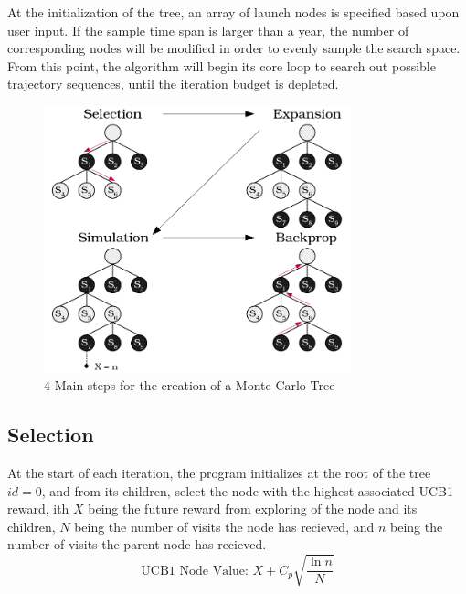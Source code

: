 \documentclass[letterpaper, preprint, paper,11pt]{AAS}	%
\begin{document}
At the initialization of the tree, an array of launch nodes is specified based upon user input. If the sample time span is larger than a year, the number of corresponding nodes will be modified in order to evenly sample the search space. From this point, the algorithm will begin its core loop to search out possible trajectory sequences, until the iteration budget is depleted. 


\begin{figure}[htb] 
	\centering\includegraphics[width=3.5in]{fig/mctsFuncs.png}
	\caption{4 Main steps for the creation of a Monte Carlo Tree}
	\label{fig:mctsFunc}
\end{figure}

\subsection{Selection} 
At the start of each iteration, the program initializes at the root of the tree $id = 0$, and from its children, select the node with the highest associated UCB1 reward, ith $X$ being the future reward from exploring of the node and its children, $N$ being the number of visits the node has recieved, and $n$ being the number of visits the parent node has recieved. 
\begin{equation}
    \label{eq:UCB1}
    \text{UCB1 Node Value: } X + C_p \sqrt{\frac{\ln{n}}{N}}
\end{equation}
\end{document}
